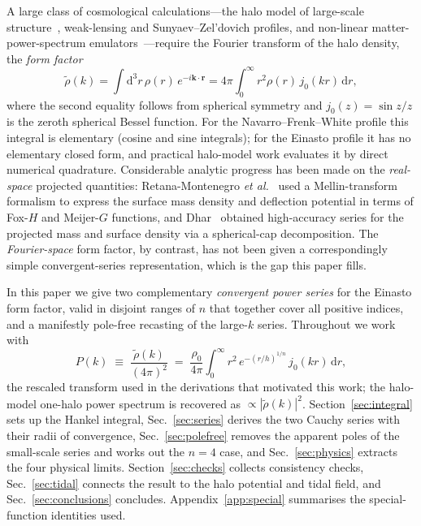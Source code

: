 \documentclass[aps,prd,onecolumn]{revtex4-2}
\begin{document}
A large class of cosmological calculations---the halo model of large-scale
structure~\cite{CoorraySheth2002}, weak-lensing and Sunyaev--Zel'dovich
profiles, and non-linear matter-power-spectrum
emulators~\cite{Smith2003}---require the Fourier transform of the halo
density, the \emph{form factor}
\begin{equation}
\tilde\rho(k)=\int\!\mathrm{d}^3r\,\rho(r)\,e^{-i\bm{k}\cdot\bm{r}}
            =4\pi\!\int_0^\infty\! r^2\rho(r)\,j_0(kr)\,\mathrm{d}r ,
\label{eq:formfactor}
\end{equation}
where the second equality follows from spherical symmetry and
$j_0(z)=\sin z/z$ is the zeroth spherical Bessel function.  For the
Navarro--Frenk--White profile this integral is elementary (cosine and sine
integrals); for the Einasto profile it has no elementary closed form, and
practical halo-model work evaluates it by direct numerical quadrature.
Considerable analytic progress has been made on the \emph{real-space}
projected quantities: Retana-Montenegro \emph{et al.}~\cite{RetanaMontenegro2012}
used a Mellin-transform formalism to express the surface mass density and
deflection potential in terms of Fox-$H$ and Meijer-$G$ functions, and
Dhar~\cite{Dhar2021} obtained high-accuracy series for the projected mass
and surface density via a spherical-cap decomposition.  The
\emph{Fourier-space} form factor, by contrast, has not been given a
correspondingly simple convergent-series representation, which is the gap
this paper fills.

In this paper we give two complementary \emph{convergent power series} for
the Einasto form factor, valid in disjoint ranges of $n$ that together
cover all positive indices, and a manifestly pole-free recasting of the
large-$k$ series.  Throughout we work with
\begin{equation}
P(k)\;\equiv\;\frac{\tilde\rho(k)}{(4\pi)^2}
   \;=\;\frac{\rho_0}{4\pi}\int_0^\infty\! r^2\,
       e^{-(r/h)^{1/n}}\,j_0(kr)\,\mathrm{d}r ,
\label{eq:Pdef}
\end{equation}
the rescaled transform used in the derivations that motivated this work;
the halo-model one-halo power spectrum is recovered as
$\propto|\tilde\rho(k)|^2$.  Section~\ref{sec:integral} sets up the
Hankel integral, Sec.~\ref{sec:series} derives the two Cauchy series with
their radii of convergence, Sec.~\ref{sec:polefree} removes the apparent
poles of the small-scale series and works out the $n=4$ case, and
Sec.~\ref{sec:physics} extracts the four physical limits.
Section~\ref{sec:checks} collects consistency checks,
Sec.~\ref{sec:tidal} connects the result to the halo potential and tidal
field, and Sec.~\ref{sec:conclusions} concludes.
Appendix~\ref{app:special} summarises the special-function identities used.
\end{document}
